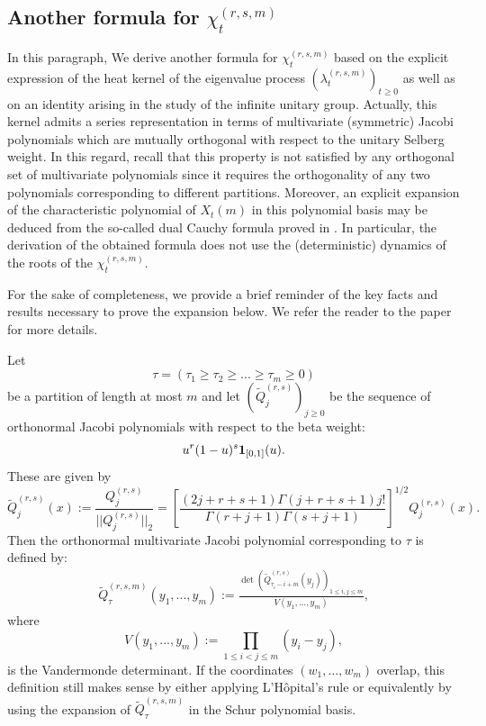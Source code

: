 \documentclass[12pt,reqno]{amsart}
\begin{document}
\subsection{Another formula for $\chi_t^{(r,s,m)}$}
\label{ssec:anotherformula}
In this paragraph, We derive another formula for $\chi_t^{(r,s,m)}$ based on the explicit expression of the heat kernel of the eigenvalue process $(\lambda_t^{(r,s,m)})_{t \geq 0}$ as well as on 
an identity arising in the study of the infinite unitary group. 
Actually, this kernel admits a series representation in terms of multivariate (symmetric) Jacobi polynomials which are mutually orthogonal with respect to the unitary Selberg weight. 
In this regard, recall that this property is not satisfied by any orthogonal set of multivariate polynomials since it requires the orthogonality of any two polynomials corresponding to different partitions. Moreover, an explicit expansion of the characteristic polynomial of $X_t(m)$ in this polynomial basis may be deduced from the so-called dual Cauchy formula proved in \cite{MR3498194}.  
In particular, the derivation of the obtained formula does not use the (deterministic) dynamics of the roots of the $\chi_t^{(r,s,m)}$.

 For the sake of completeness, we provide a brief reminder of the key facts and results necessary to prove the expansion below. We refer the reader to the paper \cite{MR2719370} for more details.

Let 
\begin{equation*}
	\tau=(\tau_1 \geq \tau_2 \geq ... \geq \tau_m \geq 0)
\end{equation*}
be a partition of length at most $m$ and let $(\tilde{Q}_j^{(r,s)})_{j \geq 0}$ be the sequence of orthonormal Jacobi polynomials with respect to the beta weight:
\begin{equation*}
	u^r(1-u)^s {\bf 1}_{[0,1]}(u).
\end{equation*}
These are given by
\begin{equation*}
	\tilde{Q}_j^{(r,s)}(x) := \frac{Q_j^{(r,s)}}{||Q_j^{(r,s)}||_2} = \left[\frac{(2j+r+s+1)\Gamma(j+r+s+1)j!}{\Gamma(r+j+1)\Gamma(s+j+1)}\right]^{1/2}Q_j^{(r,s)}(x).
\end{equation*}
Then the orthonormal multivariate Jacobi polynomial corresponding to $\tau$ is defined by:
\begin{align*}
	\tilde{Q}_{\tau}^{(r,s,m)}(y_1,...,y_m) := \frac{\det(\tilde{Q}_{\tau_i-i+m}^{(r,s)}(y_j))_{1\leq i,j \leq m}}{V(y_1,...,y_m)},
\end{align*}
where
\begin{equation*}
	V(y_1,...,y_m) := \prod_{1\leq i<j\leq m}(y_i-y_j),
\end{equation*}
is the Vandermonde determinant. If the coordinates $(w_1,...,w_m)$ overlap, this definition still makes sense by either applying L'H\^opital's rule or equivalently by using the expansion of $\tilde{Q}_{\tau}^{(r,s,m)}$ in the Schur polynomial basis.
\end{document}
